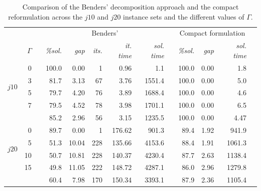 \documentclass[a4paper,abstracton]{scrartcl}
\begin{document}
\begin{table}[h]
\centering
\small  %
{\renewcommand{\arraystretch}{1.2}  %
\begin{tabular}{lrrrrrrrrrrrr}
		     \hline \hline
		     &      & & \multicolumn{5}{c}{Benders'}                                       & & \multicolumn{3}{c}{Compact formulation} \\
		     \cline{4-8} \cline{10-12}
		     & $\Gamma$ & & \textit{\%sol.} & \textit{gap} & \textit{its.} & \textit{it. time} & \textit{sol. time} & & \textit{\%sol.}   & \textit{gap}   & \textit{sol. time}   \\
		     \hline
	\multirow{4}{*}{$j10$} & 0    & & 100.0    & 0.00     & 1            & 0.96          & 1.1	    & & 100.0      & 0.00       & 1.8             \\
			       & 3    & & 81.7     & 3.13     & 67           & 3.76          & 1551.4       & & 100.0      & 0.00       & 5.0             \\
			       & 5    & & 79.7     & 4.20     & 76           & 3.89          & 1688.4       & & 100.0      & 0.00       & 4.6             \\
			       & 7    & & 79.5     & 4.52     & 78           & 3.98          & 1701.1       & & 100.0      & 0.00       & 6.5             \\
		     \cline{4-8} \cline{10-12}
			       &      & & 85.2	   & 2.96     & 56	     & 3.15 	     & 1235.5	    & & 100.0      & 0.00	& 4.47 		  \\
		     \hline
	\multirow{4}{*}{$j20$} & 0    & & 89.7     & 0.00     & 1            & 176.62        & 901.3        & & 89.4       & 1.92       & 941.9           \\
			       & 5    & & 51.3     & 10.04    & 228          & 135.66        & 4153.6       & & 88.4       & 1.91       & 1061.3          \\
			       & 10   & & 50.7     & 10.81    & 228          & 140.37        & 4230.4       & & 87.7       & 2.63       & 1138.4          \\
			       & 15   & & 49.8     & 11.05    & 222          & 148.72        & 4287.1       & & 86.0       & 2.96       & 1279.8          \\
		     \cline{4-8} \cline{10-12}
			       &      & & 60.4	   & 7.98     & 170	     & 150.34	     & 3393.1       & & 87.9       & 2.36       & 1105.4          \\
		     \hline \hline
\end{tabular}
}
\caption{Comparison of the Benders' decomposition approach and the compact reformulation across the $j10$ and $j20$ instance sets and the different values of $\Gamma$.}
\label{table:benders_vs_compact}
\end{table}
\end{document}
